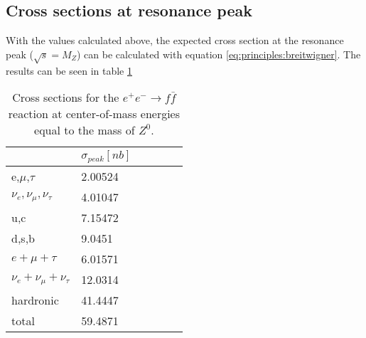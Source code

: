 \subsection{Cross sections at resonance peak}
With the values calculated above, the expected cross section at the resonance peak ($\sqrt{s}=M_Z$) can be calculated with equation \ref{eq:principles:breitwigner}.
The results can be seen in table \ref{tb:appendix:cross sections}
\begin{table}[H]\centering
	\begin{tabular}{@{}llllll@{}}
		\toprule
		& $\sigma_{peak}[nb]$\\
		\midrule
		e,$\mu $,$\tau $ & 2.00524 \\
		$\nu _e,\nu _{\mu },\nu _{\tau }$ & 4.01047 \\
		u,c & 7.15472 \\
		d,s,b & 9.0451 \\
		$e+\mu+\tau$ & 6.01571\\
		$\nu _e+\nu _{\mu }+\nu _{\tau }$ & 12.0314\\
		hardronic & 41.4447 \\
		total & 59.4871 \\
		\bottomrule
	\end{tabular}
	\caption[$e^+ e^- \rightarrow f \bar{f}$ cross sections]{Cross sections for the $e^+ e^- \rightarrow f \bar{f}$ reaction at center-of-mass energies equal to the mass of $Z^0$.}
	\label{tb:appendix:cross sections}
\end{table}
